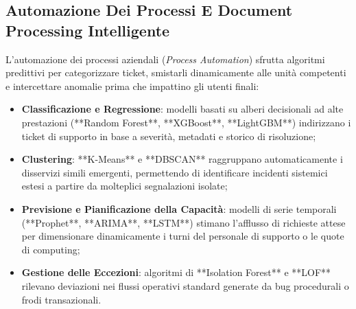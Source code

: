 \documentclass[11pt, a4paper]{article}
\begin{document}

\subsection{Automazione Dei Processi E Document Processing Intelligente}

L'automazione dei processi aziendali (\emph{Process Automation}) sfrutta algoritmi predittivi per categorizzare ticket, smistarli dinamicamente alle unità competenti e intercettare anomalie prima che impattino gli utenti finali:
\begin{itemize}
    \item \textbf{Classificazione e Regressione}: modelli basati su alberi decisionali ad alte prestazioni (**Random Forest**, **XGBoost**, **LightGBM**) indirizzano i ticket di supporto in base a severità, metadati e storico di risoluzione;
    \item \textbf{Clustering}: **K-Means** e **DBSCAN** raggruppano automaticamente i disservizi simili emergenti, permettendo di identificare incidenti sistemici estesi a partire da molteplici segnalazioni isolate;
    \item \textbf{Previsione e Pianificazione della Capacità}: modelli di serie temporali (**Prophet**, **ARIMA**, **LSTM**) stimano l'afflusso di richieste attese per dimensionare dinamicamente i turni del personale di supporto o le quote di computing;
    \item \textbf{Gestione delle Eccezioni}: algoritmi di **Isolation Forest** e **LOF** rilevano deviazioni nei flussi operativi standard generate da bug procedurali o frodi transazionali.
\end{itemize}
\end{document}
